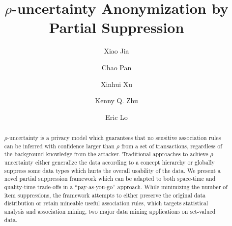 \documentclass{llncs}
\begin{document}
\title{$\rho$-uncertainty Anonymization by Partial Suppression}

\author{
Xiao Jia
\and Chao Pan
\and Xinhui Xu
\and Kenny Q. Zhu
\and Eric Lo
}

\maketitle

\begin{abstract}
$\rho$-uncertainty is a privacy model which guarantees that
no sensitive association rules can be inferred with confidence
larger than $\rho$ from a set of transactions, regardless of
the background knowledge from the attacker.
Traditional approaches to achieve $\rho$-uncertainty either
generalize the data according to a concept hierarchy or globally
suppress some data types which hurts the overall usability of the
data. We present a novel partial suppression framework
which can be adapted to both space-time and quality-time
trade-offs in a ``pay-as-you-go'' approach.
While minimizing the number of item suppressions, the framework attempts to
either preserve the original data distribution or retain mineable useful
association rules,
which targets statistical analysis and association mining,
two major data mining applications on set-valued data.
\end{abstract}








\end{document}
